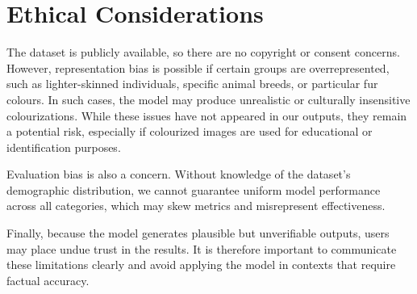 \documentclass{article} %
\begin{document}
\pagebreak

\section{Ethical Considerations}
\label{ethical}

The dataset is publicly available, so there are no copyright or consent concerns. However, representation bias is possible if certain groups are overrepresented, such as lighter-skinned 
individuals, specific animal breeds, or particular fur colours. In such cases, the model may produce unrealistic or culturally insensitive colourizations. While these issues have not appeared 
in our outputs, they remain a potential risk, especially if colourized images are used for educational or identification purposes.

Evaluation bias is also a concern. Without knowledge of the dataset's demographic distribution, we cannot guarantee uniform model performance across all categories, which may skew metrics 
and misrepresent effectiveness.

Finally, because the model generates plausible but unverifiable outputs, users may place undue trust in the results. It is therefore important to communicate these limitations clearly and 
avoid applying the model in contexts that require factual accuracy.

\label{last_page}

\newpage


\end{document}
